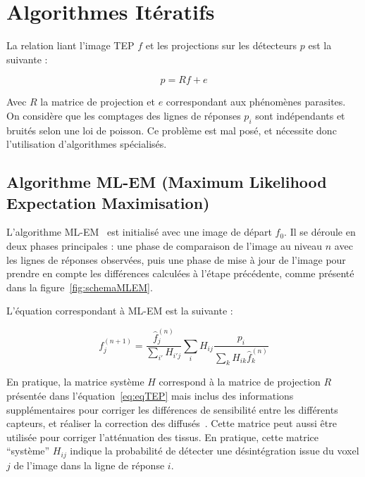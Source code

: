 	\section{Algorithmes Itératifs}

La relation liant l'image TEP $f$ et les projections sur les détecteurs $p$ est la suivante :

\begin{equation}
	p = R f + e
\label{eq:eqTEP}
\end{equation}

Avec $R$ la matrice de projection et $e$ correspondant aux phénomènes parasites. On considère que les comptages des lignes de réponses $p_i$ sont indépendants et bruités selon une loi de poisson. Ce problème est mal posé, et nécessite donc l'utilisation d'algorithmes spécialisés. 


		\subsection{Algorithme ML-EM (Maximum Likelihood Expectation Maximisation) }


L'algorithme ML-EM~\cite{shepp1982maximum} est initialisé avec une image de départ $f_0$. Il se déroule en deux phases principales : une phase de comparaison de l'image au niveau $n$ avec les lignes de réponses observées, puis une phase de mise à jour de l'image pour prendre en compte les différences calculées à l'étape précédente, comme présenté dans la figure~\ref{fig:schemaMLEM}.


L'équation correspondant à ML-EM est la suivante :

\begin{equation}
	f_j^{(n+1)}=\frac{\hat{f}_j^{(n)}}{\sum\limits_{i'}H_{i'j}}\sum\limits_{i}H_{ij}\frac{p_i}{\sum\limits_{k}H_{ik}\hat{f}_k^{(n)}}
\label{eq:MLEM}
\end{equation}

En pratique, la matrice système $H$ correspond à la matrice de projection $R$ présentée dans l'équation~\ref{eq:eqTEP} mais inclus des informations supplémentaires pour corriger les différences de sensibilité entre les différents capteurs, et réaliser la correction des diffusés~\cite{shepp1982maximum,chornoboy1990evaluation}. Cette matrice peut aussi être utilisée pour corriger l'atténuation des tissus. En pratique, cette matrice ``système'' $H_{ij}$ indique la probabilité de détecter une désintégration issue du voxel $j$ de l'image dans la ligne de réponse $i$.




